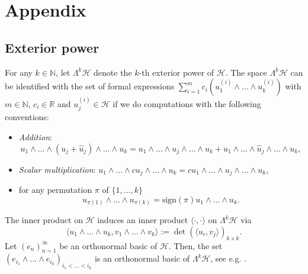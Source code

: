 \documentclass[pdflatex,sn-mathphys-num]{sn-jnl}%
\theoremstyle{thmstyleone}%
\theoremstyle{thmstyletwo}%
\theoremstyle{thmstylethree}%
\newcommand{\N}{\mathbb{N}}
\newcommand{\R}{\mathbb{R}}
\newcommand{\cH}{\mathcal{H}}
\numberwithin{equation}{section}
\begin{document}
\section{Appendix}\label{appendixA}
\subsection{Exterior power}\label{ExteriorPower}
%
For any $k\in\N$, let $\Lambda^k\cH$ denote the $k$-th exterior power of $\cH$. The space $\Lambda^k\cH$ can be identified with the set of formal expressions $\sum_{i=1}^m c_i (u_1^{(i)}\wedge\dots \wedge u_k^{(i)})$ with $m\in\N$, $c_i\in\R$ and $u_j^{(i)}\in\cH$ if we do computations with the following conventions:
\begin{itemize}
\item [1.] {\em Addition}:
\[
u_1\wedge\dots \wedge (u_j+\widehat u_j)\wedge\dots\wedge u_k =   u_1\wedge\dots \wedge u_j\wedge\dots\wedge u_k+u_1\wedge\dots \wedge \widehat u_j\wedge\dots\wedge u_k,
\]
\item [2.] {\em Scalar multiplication}: $u_1\wedge\dots \wedge c u_j\wedge\dots \wedge u_k=c u_1\wedge\dots\wedge u_j\wedge\dots\wedge u_k$,

\item [3.] for any permutation $\pi$ of $\{1,\dots,k\}$
\[
u_{\pi(1)}\wedge\dots\wedge u_{\pi (k)}
=\mbox{sign}(\pi) u_1\wedge\dots\wedge u_k.
\]
%
\end{itemize}
The inner product on $\cH$ induces an inner product $\langle\cdot,\cdot\rangle$ on $\Lambda^k{\cH}$ via
\[
\langle u_1\wedge\dots\wedge u_k, v_1\wedge \dots\wedge v_k
\rangle
:=\det (\langle u_i,v_j\rangle )_{k\times k}.
\]
%
Let $(e_n)_{n=1}^{\infty}$ be an orthonormal basic of $\mathcal H$. Then,  the set $(e_{i_1}\wedge\dots\wedge e_{i_k})_{i_1<\dots<i_k}$ is an orthonormal basic of $\Lambda^k\mathcal H$, see e.g. \cite{Temam}.
%
%
\end{document}
